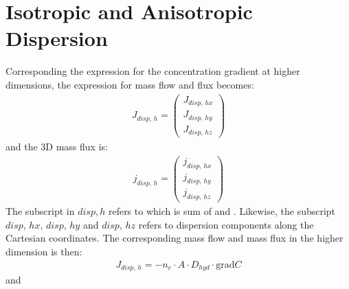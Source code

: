 \documentclass[letterpaper,10pt,english]{jupyterBook}
\begin{document}
\section{Isotropic and Anisotropic  Dispersion}
\label{\detokenize{content/transport/L10/22_reactive_transport:isotropic-and-anisotropic-dispersion}}
\sphinxAtStartPar
Corresponding the expression for the concentration gradient at higher dimensions, the expression for mass flow and flux becomes:
\begin{equation*}
\begin{split}
J_{disp,\, h} = \begin{pmatrix}
J_{disp,\, hx}\\
J_{disp,\, hy}\\
J_{disp,\, hz}
\end{pmatrix}
\end{split}
\end{equation*}
\sphinxAtStartPar
and the 3\sphinxhyphen{}D mass flux is:
\begin{equation*}
\begin{split}
j_{disp,\, h} = \begin{pmatrix}
j_{disp,\, hx}\\
j_{disp,\, hy}\\
j_{disp,\, hz}
\end{pmatrix}
\end{split}
\end{equation*}
\sphinxAtStartPar
The subscript in \({{disp, h}}\) refers to  which is sum of  and . Likewise, the subscript \({{disp,\, hx}}\), \({{disp,\, hy}}\) and \({{disp,\, hz}}\) refers to dispersion components along the Cartesian coordinates. The corresponding mass flow and mass flux in the higher dimension is then:
\begin{equation*}
\begin{split}
J_{disp,\, h} = - n_e \cdot A \cdot D_{hyd} \cdot \text{grad}C
\end{split}
\end{equation*}
\sphinxAtStartPar
and
\end{document}
